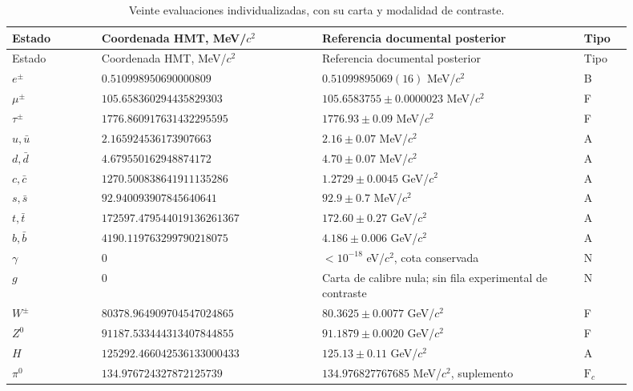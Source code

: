 \begingroup
\small
\setlength{\tabcolsep}{3pt}
\begin{longtable}{p{0.13\linewidth}p{0.32\linewidth}p{0.38\linewidth}p{0.07\linewidth}}
\caption{Veinte evaluaciones individualizadas, con su carta y modalidad de contraste.}
\label{vi:tab:vi-evaluaciones-veinte}\\
\toprule
Estado & Coordenada HMT, MeV/\(c^2\) & Referencia documental posterior & Tipo\\
\midrule
\endfirsthead
\toprule
Estado & Coordenada HMT, MeV/\(c^2\) & Referencia documental posterior & Tipo\\
\midrule
\endhead
\bottomrule
\endfoot
\(e^\pm\) & \(0.510998950\allowbreak690000809\) & \(0.51099895069(16)\) MeV/\(c^2\) & B\\
\(\mu^\pm\) & \(105.658360294\allowbreak435829303\) & \(105.6583755\pm0.0000023\) MeV/\(c^2\) & F\\
\(\tau^\pm\) & \(1776.860917631\allowbreak432295595\) & \(1776.93\pm0.09\) MeV/\(c^2\) & F\\
\(u,\bar u\) & \(2.165924536\allowbreak173907663\) & \(2.16\pm0.07\) MeV/\(c^2\) & A\\
\(d,\bar d\) & \(4.679550162\allowbreak948874172\) & \(4.70\pm0.07\) MeV/\(c^2\) & A\\
\(c,\bar c\) & \(1270.500838641\allowbreak911135286\) & \(1.2729\pm0.0045\) GeV/\(c^2\) & A\\
\(s,\bar s\) & \(92.940093907\allowbreak845640641\) & \(92.9\pm0.7\) MeV/\(c^2\) & A\\
\(t,\bar t\) & \(172597.479544019\allowbreak136261367\) & \(172.60\pm0.27\) GeV/\(c^2\) & A\\
\(b,\bar b\) & \(4190.119763299\allowbreak790218075\) & \(4.186\pm0.006\) GeV/\(c^2\) & A\\
\(\gamma\) & \(0\) & \(<10^{-18}\) eV/\(c^2\), cota conservada & N\\
\(g\) & \(0\) & Carta de calibre nula; sin fila experimental de contraste & N\\
\(W^\pm\) & \(80378.964909704\allowbreak547024865\) & \(80.3625\pm0.0077\) GeV/\(c^2\) & F\\
\(Z^0\) & \(91187.533444313\allowbreak407844855\) & \(91.1879\pm0.0020\) GeV/\(c^2\) & F\\
\(H\) & \(125292.466042536\allowbreak133000433\) & \(125.13\pm0.11\) GeV/\(c^2\) & A\\
\(\pi^0\) & \(134.976724327\allowbreak872125739\) & \(134.976827767685\) MeV/\(c^2\), suplemento & \(\mathrm F_c\)\\

\end{longtable}
